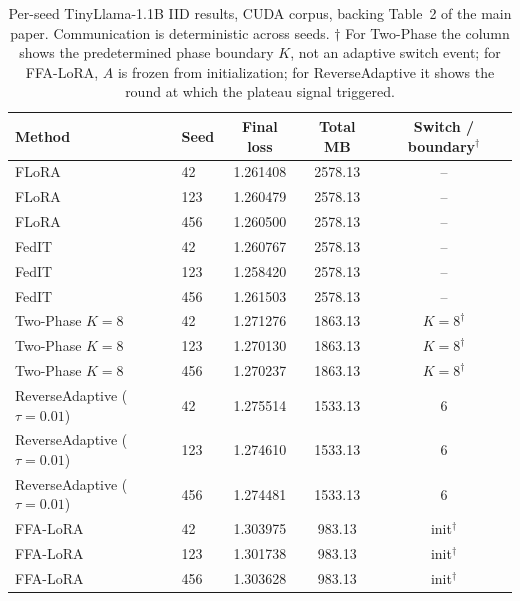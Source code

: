 \documentclass{ieeetj}
\begin{document}
\begin{table}[t]
\caption{Per-seed TinyLlama-1.1B IID results, CUDA corpus, backing Table~2 of the main paper. Communication is deterministic across seeds. $\dagger$ For Two-Phase the column shows the predetermined phase boundary $K$, not an adaptive switch event; for FFA-LoRA, $A$ is frozen from initialization; for ReverseAdaptive it shows the round at which the plateau signal triggered.}
\label{tab:b1}
\begin{center}
\small
\setlength{\tabcolsep}{6pt}
\begin{tabular}{llccc}
\toprule
Method & Seed & Final loss & Total MB & Switch / boundary$^\dagger$ \\
\midrule
FLoRA & 42 & 1.261408 & 2578.13 & -- \\
FLoRA & 123 & 1.260479 & 2578.13 & -- \\
FLoRA & 456 & 1.260500 & 2578.13 & -- \\
FedIT & 42 & 1.260767 & 2578.13 & -- \\
FedIT & 123 & 1.258420 & 2578.13 & -- \\
FedIT & 456 & 1.261503 & 2578.13 & -- \\
Two-Phase $K{=}8$ & 42 & 1.271276 & 1863.13 & $K{=}8^\dagger$ \\
Two-Phase $K{=}8$ & 123 & 1.270130 & 1863.13 & $K{=}8^\dagger$ \\
Two-Phase $K{=}8$ & 456 & 1.270237 & 1863.13 & $K{=}8^\dagger$ \\
ReverseAdaptive ($\tau{=}0.01$) & 42 & 1.275514 & 1533.13 & 6 \\
ReverseAdaptive ($\tau{=}0.01$) & 123 & 1.274610 & 1533.13 & 6 \\
ReverseAdaptive ($\tau{=}0.01$) & 456 & 1.274481 & 1533.13 & 6 \\
FFA-LoRA & 42 & 1.303975 & \phantom{0}983.13 & init$^\dagger$ \\
FFA-LoRA & 123 & 1.301738 & \phantom{0}983.13 & init$^\dagger$ \\
FFA-LoRA & 456 & 1.303628 & \phantom{0}983.13 & init$^\dagger$ \\
\bottomrule
\end{tabular}
\end{center}
\end{table}
\end{document}
